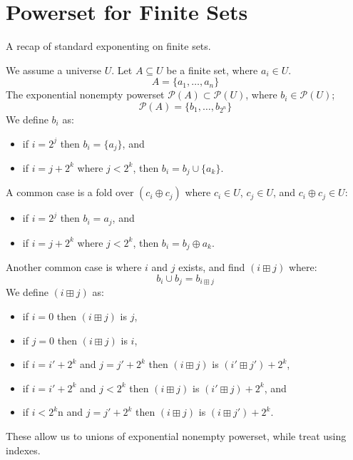 \documentclass[acmsmall,review,screen]{acmart}
\begin{document}
\appendix

\section{Powerset for Finite Sets}
\label{app:powerser}

A recap of standard exponenting on finite sets.

We assume a universe $U$.
Let $A \subseteq U$ be a finite set, where $a_i \in U$.
\[
  A = \{ a_1, \dots, a_n \}
\]
The exponential nonempty powerset $\mathcal{P}(A) \subset \mathcal{P}(U)$,
where $b_i \in \mathcal{P}(U)$;
\[
  \mathcal{P}(A) = \{ b_1, \dots, b_{2^n} \}
\]
We define $b_i$ as:
\begin{itemize}
\item if $i = 2^j$ then $b_i = \{ a_j \}$, and
\item if $i = j + 2^k$ where $j < 2^k$,
  then $b_i = b_j \cup \{ a_k \}$.
\end{itemize}
A common case is a fold over $(c_i \oplus c_j)$ where $c_i \in U$, $c_j \in U$, and
$c_i \oplus c_j \in U$:
\begin{itemize}
\item if $i = 2^j$ then $b_i = a_j$, and
\item if $i = j + 2^k$ where $j < 2^k$,
  then $b_i = b_j \oplus a_k$.
\end{itemize}
Another common case is where $i$ and $j$ exists,
and find $(i \boxplus j)$ where:
\[
  b_i \cup b_j = b_{i \boxplus j}
\]
We define $(i \boxplus j)$ as:
\begin{itemize}
\item if $i = 0$ then $(i \boxplus j)$ is $j$,
\item if $j = 0$ then $(i \boxplus j)$ is $i$,
\item if $i = i' + 2^k$ and $j = j' + 2^k$
  then $(i \boxplus j)$ is $(i' \boxplus j') + 2^k$,
\item if $i = i' + 2^k$ and $j < 2^k$
  then $(i \boxplus j)$ is $(i' \boxplus j) + 2^k$, and
\item if $i < 2^k$n and $j = j' + 2^k$
  then $(i \boxplus j)$ is $(i \boxplus j') + 2^k$.
\end{itemize}
These allow us to unions of exponential nonempty powerset,
while treat using indexes.




\end{document}
